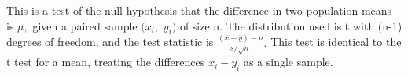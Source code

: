  This is a test of the null hypothesis that the difference in two 
population means is $ \mu , $ given a paired sample $(x_{i},$  $y_{i})$  of size n. The distribution used is t with (n-1)
degrees of freedom, and the test statistic is  
$ \frac{ ( \bar{x} - \bar{y} ) - \mu }{ s / \sqrt{n} } . $ This test is
identical to the t test for a mean, treating the 
differences $x_{i}-y_{i}$ 
as a single sample.
